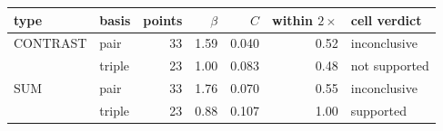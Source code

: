 \footnotesize
\begin{tabular}{llrrrrl}
\toprule
type & basis & points & $\beta$ & $C$ & within $2\times$ & cell verdict \\
\midrule
CONTRAST & pair & 33 & 1.59 & 0.040 & 0.52 & inconclusive \\
 & triple & 23 & 1.00 & 0.083 & 0.48 & not supported \\
SUM & pair & 33 & 1.76 & 0.070 & 0.55 & inconclusive \\
 & triple & 23 & 0.88 & 0.107 & 1.00 & supported \\
\bottomrule
\end{tabular}
